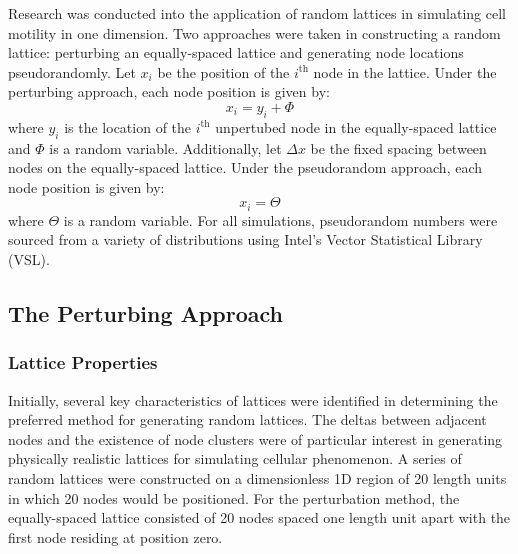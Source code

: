 \documentclass[11pt,a4paper]{article}
\begin{document}
	Research was conducted into the application of random lattices in simulating cell motility in one dimension. Two approaches were taken in constructing a random lattice: perturbing an equally-spaced lattice and generating node locations pseudorandomly. Let $x_i$ be the position of the $i^\text{th}$ node in the lattice. Under the perturbing approach, each node position is given by:
	\begin{equation*}
		x_i = y_i + \Phi
	\end{equation*}
	where $y_i$ is the location of the $i^{\text{th}}$ unpertubed node in the equally-spaced lattice and $\Phi$ is a random variable. Additionally, let $\Delta x$ be the fixed spacing between nodes on the equally-spaced lattice. Under the pseudorandom approach, each node position is given by:
	\begin{equation*}
		x_i = \Theta
	\end{equation*}
	where $\Theta$ is a random variable. For all simulations, pseudorandom numbers were sourced from a variety of distributions using Intel's Vector Statistical Library (VSL).

	\subsection{The Perturbing Approach}
		\label{sub:theperturbingapproach}
		
		\subsubsection{Lattice Properties}
		\label{sub:latticeproperties_perturbed}
			
			Initially, several key characteristics of lattices were identified in determining the preferred method for generating random lattices. The deltas between adjacent nodes and the existence of node clusters were of particular interest in generating physically realistic lattices for simulating cellular phenomenon. A series of random lattices were constructed on a dimensionless 1D region of 20 length units in which 20 nodes would be positioned. For the perturbation method, the equally-spaced lattice consisted of 20 nodes spaced one length unit apart with the first node residing at position zero. 
\end{document}
